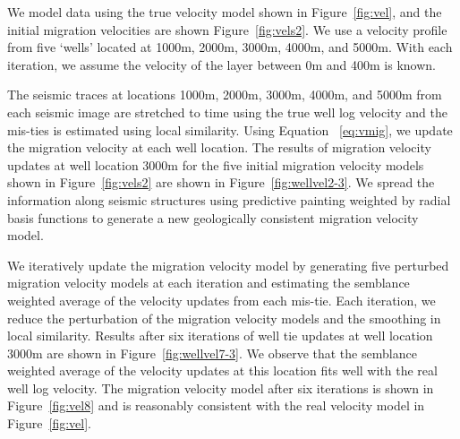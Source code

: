 We model data using the true velocity model shown in Figure~\ref{fig:vel}, and the initial migration velocities are shown Figure~\ref{fig:vels2}. We use a velocity profile from five `wells' located at 1000m, 2000m, 3000m, 4000m, and 5000m. With each iteration, we assume the velocity of the layer between 0m and 400m is known.


The seismic traces at locations 1000m, 2000m, 3000m, 4000m, and 5000m from each seismic image are stretched to time using the true well log velocity and the mis-ties is estimated using local similarity. Using Equation ~\ref{eq:vmig}, we update the migration velocity at each well location. The results of migration velocity updates at well location 3000m for the five initial migration velocity models shown in Figure~\ref{fig:vels2} are shown in Figure~\ref{fig:wellvel2-3}. We spread the information along seismic structures using predictive painting weighted by radial basis functions to generate a new geologically consistent migration velocity model.


We iteratively update the migration velocity model by generating five perturbed migration velocity models at each iteration and estimating the semblance weighted average of the velocity updates from each mis-tie. Each iteration, we reduce the perturbation of the migration velocity models and the smoothing in local similarity. Results after six iterations of well tie updates at well location 3000m are shown in Figure~\ref{fig:wellvel7-3}. We observe that the semblance weighted average of the velocity updates at this location fits well with the real well log velocity. The migration velocity model after six iterations is shown in Figure~\ref{fig:vel8} and is reasonably consistent with the real velocity model in Figure~\ref{fig:vel}.

